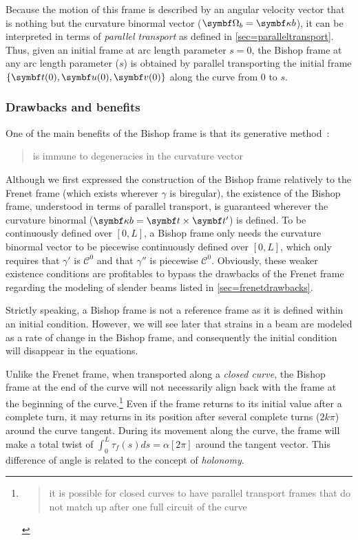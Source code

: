 Because the motion of this frame is described by an angular velocity vector that is nothing but the curvature binormal vector ($\vect{\Omega_b} = \vect{\kappa b}$), it can be interpreted in terms of \emph{parallel transport} as defined in \cref{sec=paralleltransport}. Thus, given an initial frame at arc length parameter $s=0$, the Bishop frame at any arc length parameter ($s$) is obtained by parallel transporting the initial frame $\{\vect{t}(0),\vect{u}(0), \vect{v}(0)\}$ along the curve from $0$ to $s$.

\subsubsection{Drawbacks and benefits}
One of the main benefits of the Bishop frame is that its generative method~: \blockcquote{Bloomenthal1990}{is immune to degeneracies in the curvature vector}. Although we first expressed the construction of the Bishop frame relatively to the Frenet frame (which exists wherever $\gamma$ is biregular), the existence of the Bishop frame, understood in terms of parallel transport, is guaranteed wherever the curvature binormal ($\vect{\kappa b} = \vect{t} \times \vect{t}'$) is defined. To be continuously defined over $[0,L]$, a Bishop frame only needs the curvature binormal vector to be piecewise continuously defined over  $[0,L]$, which only requires that $\gamma'$ is $\mathcal{C}^0$ and that $\gamma''$ is piecewise $\mathcal{C}^0$. Obviously, these weaker existence conditions are profitables to bypass the drawbacks of the Frenet frame regarding the modeling of slender beams listed in \cref{sec=frenetdrawbacks}.

Strictly speaking, a Bishop frame is not a reference frame as it is defined within an initial condition. However, we will see later that strains in a beam are modeled as a rate of change in the Bishop frame, and consequently the initial condition will disappear in the equations.

Unlike the Frenet frame, when transported along a \emph{closed curve}, the Bishop frame at the end of the curve will not necessarily align back with the frame at the beginning of the curve.\footnote{\blockcquote{Hanson95}{it is possible for closed curves to have parallel transport frames that do not match up after one full circuit of the curve}.} Even if the frame returns to its initial value after a complete turn, it may returns in its position after several complete turns ($2k\pi$) around the curve tangent. During its movement along the curve, the frame will make a total twist of $\int_0^L \tau_f(s)ds = \alpha[2\pi]$ around the tangent vector. This difference of angle is related to the concept of \emph{holonomy}.

